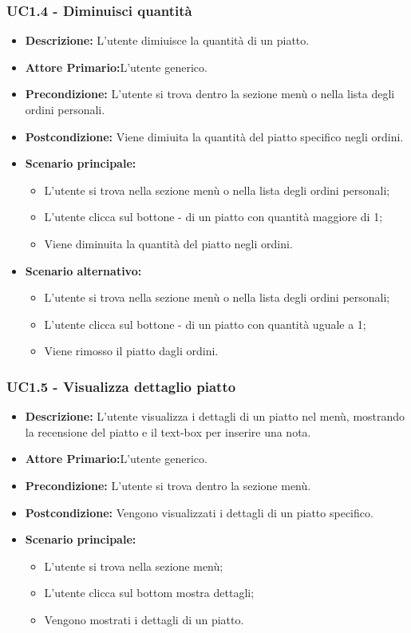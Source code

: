 \subsubsection{UC1.4 - Diminuisci quantità}
\begin{itemize}
    \item \textbf{Descrizione:} L'utente dimiuisce la quantità di un piatto.
    \item \textbf{Attore Primario:}L'utente generico.
    \item \textbf{Precondizione:} L'utente si trova dentro la sezione menù o nella lista degli ordini personali.
    \item \textbf{Postcondizione:} Viene dimiuita la quantità del piatto specifico negli ordini.
    \item \textbf{Scenario principale:}
    \begin{itemize}
        \item L'utente si trova nella sezione menù o nella lista degli ordini personali;
        \item L'utente clicca sul bottone - di un piatto con quantità maggiore di 1;
        \item Viene diminuita la quantità del piatto negli ordini.
    \end{itemize}
    \item \textbf{Scenario alternativo:}
    \begin{itemize}
        \item L'utente si trova nella sezione menù o nella lista degli ordini personali;
        \item L'utente clicca sul bottone - di un piatto con quantità uguale a 1;
        \item Viene rimosso il piatto dagli ordini.
    \end{itemize}
\end{itemize}
\subsubsection{UC1.5 - Visualizza dettaglio piatto}
\begin{itemize}
    \item \textbf{Descrizione:} L'utente visualizza i dettagli di un piatto nel menù, mostrando la recensione del piatto e il text-box per inserire una nota.
    \item \textbf{Attore Primario:}L'utente generico.
    \item \textbf{Precondizione:} L'utente si trova dentro la sezione menù.
    \item \textbf{Postcondizione:} Vengono visualizzati i dettagli di un piatto specifico.
    \item \textbf{Scenario principale:}  
    \begin{itemize}
        \item L'utente si trova nella sezione menù;
        \item L'utente clicca sul bottom mostra dettagli;
        \item Vengono mostrati i dettagli di un piatto.
    \end{itemize}
\end{itemize}
